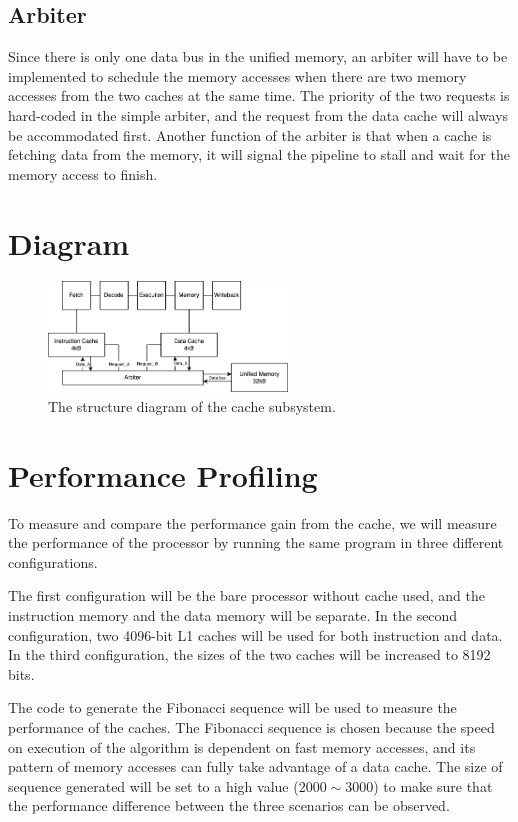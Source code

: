 \documentclass[lettersize,conference]{IEEEtran}
\begin{document}
\subsection{Arbiter}
Since there is only one data bus in the unified memory, an arbiter will have to be implemented to schedule the memory accesses when there are two memory accesses from the two caches at the same time. The priority of the two requests is hard-coded in the simple arbiter, and the request from the data cache will always be accommodated first. Another function of the arbiter is that when a cache is fetching data from the memory, it will signal the pipeline to stall and wait for the memory access to finish. 

\section{Diagram}
\begin{figure}[H]
\centering
\includegraphics[width=2.5in]{cache_diagram}
\caption{The structure diagram of the cache subsystem.}
\label{fig_cache}
\end{figure}

\section{Performance Profiling}
To measure and compare the performance gain from the cache, we will measure the performance of the processor by running the same program in three different configurations. \par
The first configuration will be the bare processor without cache used, and the instruction memory and the data memory will be separate. In the second configuration, two 4096-bit L1 caches will be used for both instruction and data. In the third configuration, the sizes of the two caches will be increased to 8192 bits. \par
The code to generate the Fibonacci sequence will be used to measure the performance of the caches. The Fibonacci sequence is chosen because the speed on execution of the algorithm is dependent on fast memory accesses, and its pattern of memory accesses can fully take advantage of a data cache. The size of sequence generated will be set to a high value ($2000\sim3000$) to make sure that the performance difference between the three scenarios can be observed.\par
\end{document}

